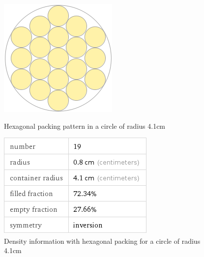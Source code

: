 \begin{figure}[ht!]
\centering

    \begin{minipage}{0.4\textwidth}
    \centering
    \includegraphics[width= \textwidth]{Figures/Packing/hexagonalPacking_r0.8_R4.1.png}
    \caption{Hexagonal packing pattern in a circle of radius 4.1cm}
    \label{fig:hex4.1}
    \end{minipage}\hfill
    \begin{minipage}{0.4\textwidth}
    \centering
    \includegraphics[width= \textwidth]{Figures/Packing/hexagonalPacking_r0.8_R4.1_packingPercent.png}
    \caption{Density information with hexagonal packing for a circle of radius 4.1cm}
    \label{fig:hex4.1_packinginfo}
    \end{minipage}
    
\end{figure}

